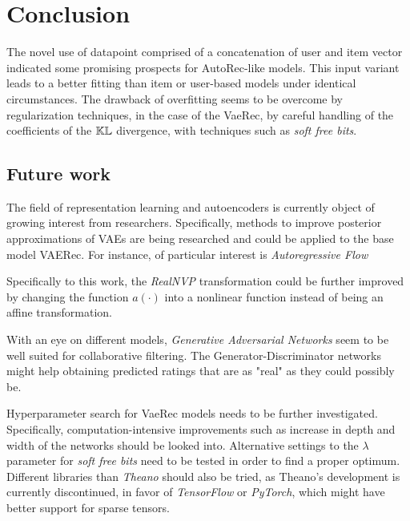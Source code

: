 \chapter{Conclusion}

The novel use of datapoint comprised of a concatenation of user and item vector indicated
some promising prospects for AutoRec-like models. This input variant
leads to a better fitting than item or user-based models under identical circumstances.
The drawback of overfitting seems to be overcome by 
regularization techniques, in the case of the VaeRec, by careful handling of the
coefficients of the $\mathbb{KL}$ divergence, with techniques such as \emph{soft free bits}.

\section{Future work}

The field of representation learning and autoencoders is currently object of
growing interest from researchers. Specifically, methods to improve posterior
approximations of VAEs are being researched and could be applied to the base model
VAERec. For instance, of particular interest is \emph{Autoregressive Flow}
\cite{autoregressive_flow}

Specifically to this work, the \emph{RealNVP} transformation 
could be further improved by changing the function $a(\cdot)$ into
a nonlinear function instead of being an affine transformation.

With an eye on different models, 
\emph{Generative Adversarial Networks} \cite{GAN} seem to be well suited 
for collaborative filtering. The Generator-Discriminator networks might help
obtaining predicted ratings that are as "real" as they could possibly be.

Hyperparameter search for VaeRec models needs to be further
investigated. Specifically, computation-intensive improvements
such as increase in depth and width of the networks should be looked into.
Alternative settings to the $\lambda$ parameter for \emph{soft free bits}
need to be tested in order to find a proper optimum.
Different libraries than \emph{Theano}\cite{theano} should also be tried, as Theano's
development is currently discontinued, in favor of \emph{TensorFlow}\cite{tensorflow}
or \emph{PyTorch}\cite{pytorch}, which might have better support for sparse tensors.
